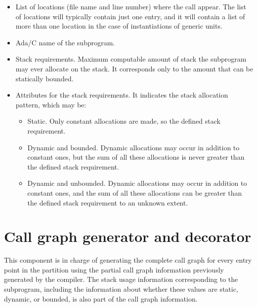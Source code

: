 \begin{itemize}

\item List of locations (file name and line number) where the call
 appear. The list of locations will typically contain  just one entry,
 and it will contain a list of more than one location in the case of
 instantiations of generic units.

\item Ada/C name of the subprogram.

\item Stack requirements. Maximum computable amount of stack the
  subprogram may ever allocate on the stack. It corresponds only to
  the amount that  can be statically bounded.

\item Attributes for the stack requirements. It indicates the stack
  allocation pattern, which may be:

  \begin{itemize}

  \item Static. Only constant allocations are made, so the defined
    stack requirement.

  \item Dynamic and bounded. Dynamic allocations may occur in addition
  to constant ones, but the sum of all these allocations is never
  greater than the defined stack requirement.

  \item Dynamic and unbounded. Dynamic allocations may occur in
  addition to constant ones, and the sum of all these allocations can
  be greater than the defined stack requirement to an unknown extent.

  \end{itemize}
  
\end{itemize}

\section{Call graph generator and decorator}

This component is in charge of generating the complete call graph for
every entry point in the partition using the partial call graph
information previously generated by the compiler. The stack usage
information corresponding to the subprogram, including the information
about whether these values are static, dynamic, or bounded, is also
part of the call graph information.

